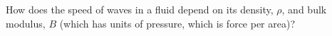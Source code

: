 How does the speed of waves in a fluid depend on its density, $\rho$, and bulk modulus, $B$ (which has units of pressure, which is force per area)?